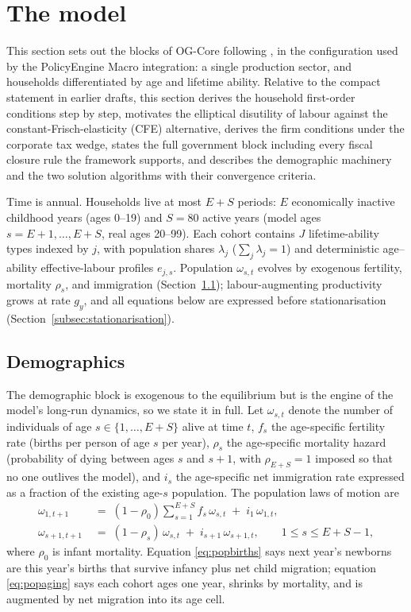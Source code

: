\section{The model}
\label{sec:model}

This section sets out the blocks of OG-Core following \citet{DeBackerEvans2024}, in the configuration used by the PolicyEngine Macro integration: a single production sector, and households differentiated by age and lifetime ability. Relative to the compact statement in earlier drafts, this section derives the household first-order conditions step by step, motivates the elliptical disutility of labour against the constant-Frisch-elasticity (CFE) alternative, derives the firm conditions under the corporate tax wedge, states the full government block including every fiscal closure rule the framework supports, and describes the demographic machinery and the two solution algorithms with their convergence criteria.

Time is annual. Households live at most $E+S$ periods: $E$ economically inactive childhood years (ages 0--19) and $S=80$ active years (model ages $s = E+1,\dots,E+S$, real ages 20--99). Each cohort contains $J$ lifetime-ability types indexed by $j$, with population shares $\lambda_j$ ($\sum_j \lambda_j = 1$) and deterministic age--ability effective-labour profiles $e_{j,s}$. Population $\omega_{s,t}$ evolves by exogenous fertility, mortality $\rho_s$, and immigration (Section~\ref{subsec:demographics}); labour-augmenting productivity grows at rate $g_y$, and all equations below are expressed before stationarisation (Section~\ref{subsec:stationarisation}).

\subsection{Demographics}
\label{subsec:demographics}

The demographic block is exogenous to the equilibrium but is the engine of the model's long-run dynamics, so we state it in full. Let $\omega_{s,t}$ denote the number of individuals of age $s\in\{1,\dots,E+S\}$ alive at time $t$, $f_s$ the age-specific fertility rate (births per person of age $s$ per year), $\rho_s$ the age-specific mortality hazard (probability of dying between ages $s$ and $s+1$, with $\rho_{E+S}=1$ imposed so that no one outlives the model), and $i_s$ the age-specific net immigration rate expressed as a fraction of the existing age-$s$ population. The population laws of motion are
\begin{align}
\label{eq:popbirths}
\omega_{1,t+1} &\;=\; (1-\rho_0)\sum_{s=1}^{E+S} f_s\,\omega_{s,t} \;+\; i_1\,\omega_{1,t},\\
\label{eq:popaging}
\omega_{s+1,t+1} &\;=\; (1-\rho_s)\,\omega_{s,t} \;+\; i_{s+1}\,\omega_{s+1,t},
\qquad 1 \le s \le E+S-1 ,
\end{align}
where $\rho_0$ is infant mortality. Equation \eqref{eq:popbirths} says next year's newborns are this year's births that survive infancy plus net child migration; equation \eqref{eq:popaging} says each cohort ages one year, shrinks by mortality, and is augmented by net migration into its age cell.

